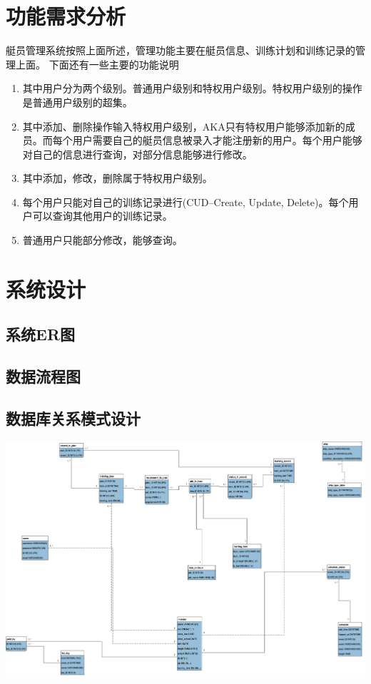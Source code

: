 \section{功能需求分析}
艇员管理系统按照上面所述，管理功能主要在艇员信息、训练计划和训练记录的管理上面。
下面还有一些主要的功能说明
\begin{enumerate}
\item{其中用户分为两个级别。普通用户级别和特权用户级别。特权用户级别的操作是普通用户级别的超集。}

\item{其中添加、删除操作输入特权用户级别，AKA只有特权用户能够添加新的成员。而每个用户需要自己的艇员信息被录入才能注册新的用户。每个用户能够对自己的信息进行查询，对部分信息能够进行修改。}

\item{其中添加，修改，删除属于特权用户级别。}

\item{每个用户只能对自己的训练记录进行(CUD--Create, Update, Delete)。每个用户可以查询其他用户的训练记录。}

\item{普通用户只能部分修改，能够查询。}
\end{enumerate}

\section{系统设计}
\subsection{系统ER图}

\subsection{数据流程图}

\subsection{数据库关系模式设计}
\includegraphics[width=\textwidth]{figure/relation-schema}
